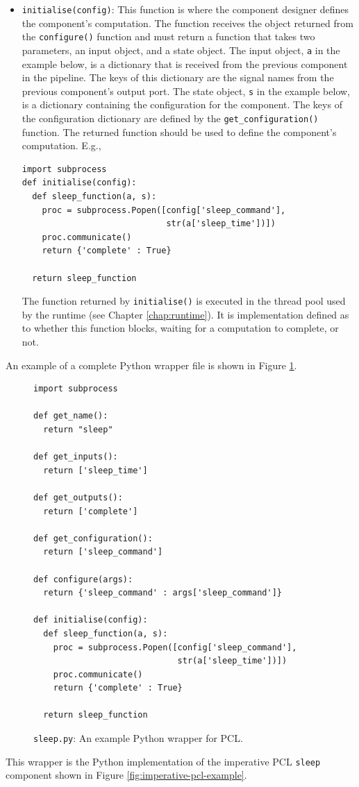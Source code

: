 \begin{itemize}
\item \texttt{initialise(config)}: This function is where the component designer defines the component's computation. The function receives the object returned from the \texttt{configure()} function and must return a function that takes two parameters, an input object, and a state object. The input object, \texttt{a} in the example below, is a dictionary that is received from the previous component in the pipeline. The keys of this dictionary are the signal names from the previous component's output port. The state object, \texttt{s} in the example below, is a dictionary containing the configuration for the component. The keys of the configuration dictionary are defined by the \texttt{get\_configuration()} function. The returned function should be used to define the component's computation. E.g.,
\begin{verbatim}
import subprocess
def initialise(config):
  def sleep_function(a, s):
    proc = subprocess.Popen([config['sleep_command'],
                             str(a['sleep_time'])])
    proc.communicate()
    return {'complete' : True}

  return sleep_function
\end{verbatim}
The function returned by \texttt{initialise()} is executed in the thread pool used by the runtime (see Chapter \ref{chap:runtime}). It is implementation defined as to whether this function blocks, waiting for a computation to complete, or not.
\end{itemize}

An example of a complete Python wrapper file is shown in Figure \ref{fig:python-wrapper}.
\begin{figure}[h!]
\begin{verbatim}
import subprocess

def get_name():
  return "sleep"

def get_inputs():
  return ['sleep_time']

def get_outputs():
  return ['complete']

def get_configuration():
  return ['sleep_command']

def configure(args):
  return {'sleep_command' : args['sleep_command']}

def initialise(config):
  def sleep_function(a, s):
    proc = subprocess.Popen([config['sleep_command'],
                             str(a['sleep_time'])])
    proc.communicate()
    return {'complete' : True}

  return sleep_function
\end{verbatim}
\caption{\texttt{sleep.py}: An example Python wrapper for PCL.}
\label{fig:python-wrapper}
\end{figure}
This wrapper is the Python implementation of the imperative PCL \texttt{sleep} component shown in Figure \ref{fig:imperative-pcl-example}.
